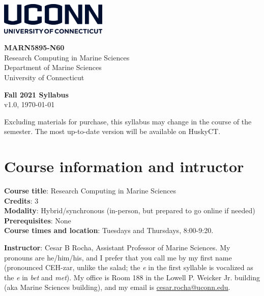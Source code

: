\documentclass[11pt]{article}
\begin{document}
\parbox{.5\linewidth}
{
\begin{flushleft}
\includegraphics[height=0.6in]{uconn-wordmark-stacked-blue}\\
\vspace{1em}
\end{flushleft}
}
\parbox{.5\linewidth}
{
\begin{flushright}
{\bf MARN5895-N60 }\\
    Research Computing in Marine Sciences\\
    \vspace{.1cm}
{\footnotesize Department of Marine Sciences\\
University of Connecticut\\
}
\end{flushright}
}

\vspace{1em}

%
%
\begin{center}
\textbf{Fall 2021 Syllabus}\\
{\footnotesize v1.0, \today}
\end{center}
\vspace{-.6cm}
{\footnotesize Excluding materials for purchase, this syllabus may change in the course of the semester. The most up-to-date version will be available on HuskyCT.}

\section*{Course information and intructor}

\textbf{Course title}:  Research Computing in Marine Sciences\\
\textbf{Credits}:  3\\
\textbf{Modality}:  Hybrid/synchronous (in-person, but prepared to go online if needed)\\
\textbf{Prerequisites}:  None\\
\textbf{Course times and location}: Tuesdays and Thursdays, 8:00-9:20.

\bigskip

\textbf{Instructor}: Cesar B Rocha, Assistant Professor  of Marine Sciences. My
pronouns are he/him/his, and I prefer that you call me by my first name (pronounced
{CEH-zar}, unlike the salad; the \emph{e} in the first syllable is vocalized
as the \textit{e} in \emph{bet} and \emph{met}).  My office is Room 188 in the
Lowell P. Weicker Jr. building (aka Marine Sciences building), and my email is  \href{mailto:cesar.rocha@uconn.edu}{cesar.rocha@uconn.edu}.
\end{document}
